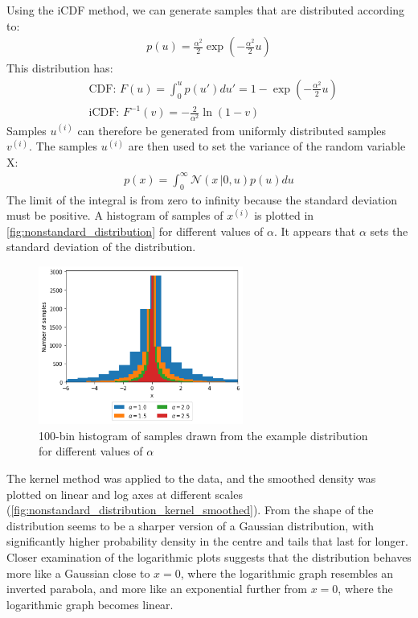 \documentclass[a4paper]{article}
\begin{document}
Using the iCDF method, we can generate samples that are distributed according to:
\begin{align*}
    p(u) = \frac{\alpha^2}{2} \exp\left(-\frac{\alpha^2}{2} u\right)
\end{align*}
This distribution has:
\begin{align*}
    & \text{CDF: } F(u) = \int_0^u p(u') du' = 1 - \exp\left(-\frac{\alpha^2}{2} u\right) \\
    & \text{iCDF: } F^{-1}(v) = -\frac{2}{\alpha^2} \ln(1 - v)
\end{align*}
Samples $u^{(i)}$ can therefore be generated from uniformly distributed samples $v^{(i)}$.
The samples $u^{(i)}$ are then used to set the variance of the random variable X:
\begin{align*}
    p(x) = \int_{0}^{\infty} \mathcal{N}(x\,|0, u) p(u) du
\end{align*}
The limit of the integral is from zero to infinity because the standard deviation must be positive.
A histogram of samples of $x^{(i)}$ is plotted in \autoref{fig:nonstandard_distribution} for different values of
$\alpha$. It appears that $\alpha$ sets the standard deviation of the distribution.
\begin{figure}[h]
\centering
\includegraphics[width=0.6\textwidth]{figures/nonstandard_distribution.png}
\caption{100-bin histogram of samples drawn from the example distribution for different values of $\alpha$}
\label{fig:nonstandard_distribution}
\end{figure}

The kernel method was applied to the data, and the smoothed density was plotted on linear and log axes at different
scales (\autoref{fig:nonstandard_distribution_kernel_smoothed}). From the shape of the distribution
seems to be a sharper version of a Gaussian distribution, with significantly higher probability density in the centre
and tails that last for longer. Closer examination of the logarithmic plots suggests that the distribution behaves
more like a Gaussian close to $x=0$, where the logarithmic graph resembles an inverted parabola, and more like an
exponential further from $x=0$, where the logarithmic graph becomes linear.
\end{document}
